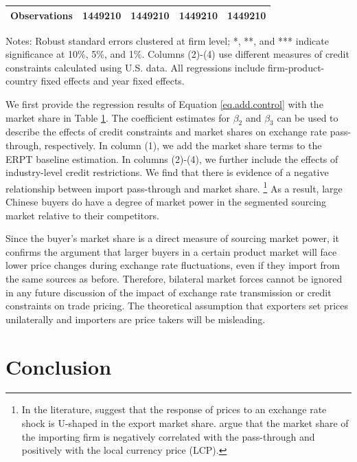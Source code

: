\begin{table}[htb]
\begin{threeparttable}
\begin{tabular}{lcccc}
			Observations & 1449210  & 1449210 & 1449210 & 1449210 \\
			\bottomrule
		\end{tabular}
		\begin{tablenotes}
			\footnotesize
			\item[Notes:] Robust standard errors clustered at firm level; *, **, and *** indicate significance at 10\%, 5\%, and 1\%. Columns (2)-(4) use different measures of credit constraints calculated using U.S. data. All regressions include firm-product-country fixed effects and year fixed effects.
		\end{tablenotes}
	\end{threeparttable}
	\label{tab.share}
\end{table}

We first provide the regression results of Equation \ref{eq.add.control} with the market share in Table \ref{tab.share}. The coefficient estimates for $\beta_2$ and $\beta_3$ can be used to describe the effects of credit constraints and market shares on exchange rate pass-through, respectively. In column (1), we add the market share terms to the ERPT baseline estimation. In columns (2)-(4), we further include the effects of industry-level credit restrictions. We find that there is evidence of a negative relationship between import pass-through and market share. \footnote{In the literature, \cite{auer2016} suggest that the response of prices to an exchange rate shock is U-shaped in the export market share. \cite{devereux2017} argue that the market share of the importing firm is negatively correlated with the pass-through and positively with the local currency price (LCP).} As a result, large Chinese buyers do have a degree of market power in the segmented sourcing market relative to their competitors.

Since the buyer's market share is a direct measure of sourcing market power, it confirms the argument that larger buyers in a certain product market will face lower price changes during exchange rate fluctuations, even if they import from the same sources as before. Therefore, bilateral market forces cannot be ignored in any future discussion of the impact of exchange rate transmission or credit constraints on trade pricing. The theoretical assumption that exporters set prices unilaterally and importers are price takers will be misleading.

\section{Conclusion}\label{Conclusion}

